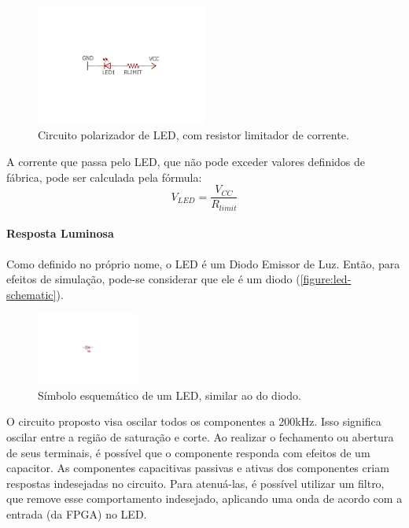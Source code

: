 	\begin{figure}[htb]
		\caption{\label{figure:led-circuit}Circuito polarizador de LED, com resistor limitador de corrente.}
		\centering
		\includegraphics[width=0.5\textwidth, trim={8cm 8cm 8cm 8.5cm},clip]{circuits/led_circuit.pdf}
	\end{figure}

	A corrente que passa pelo LED, que não pode exceder valores definidos de fábrica, pode ser calculada pela fórmula:
	\begin{equation}
	V_{LED} = \frac{V_{CC}}{R_{limit}}
	\end{equation}

	\paragraph{Resposta Luminosa}

	Como definido no próprio nome, o LED é um Diodo Emissor de Luz. Então, para efeitos de simulação, pode-se considerar que ele é um diodo (\autoref{figure:led-schematic}).

	\begin{figure}[h]
		\caption{\label{figure:led-schematic}Símbolo esquemático de um LED, similar ao do diodo.}
		\centering
		\includegraphics[width=0.3\textwidth, trim={12cm 9.2cm 12cm 9.5cm},clip]{circuits/led_schematics.pdf}
	\end{figure}

	O circuito proposto visa oscilar todos os componentes a 200kHz. Isso significa oscilar entre a região de saturação e corte. Ao realizar o fechamento ou abertura de seus terminais, é possível que o componente responda com efeitos de um capacitor. As componentes capacitivas passivas e ativas dos componentes criam respostas indesejadas no circuito. Para atenuá-las, é possível utilizar um filtro, que remove esse comportamento indesejado, aplicando uma onda de acordo com a entrada (da FPGA) no LED.

